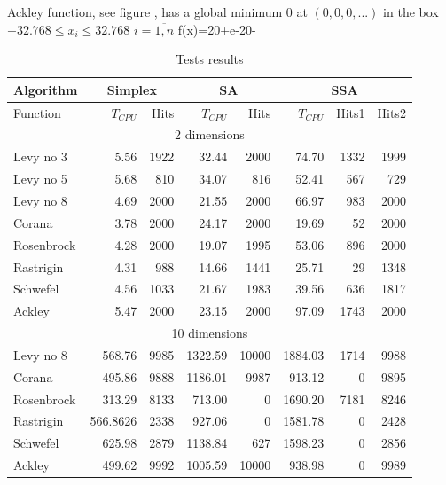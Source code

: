 \par{Ackley function, see figure ,  has a global minimum 0 at
$(0,0,0,...)$ in the box $-32.768\leq x_i \leq 32.768$ $i=\overline{1,n}$}
%
\be
\label{ackleyf}
f(x)=20+e-20\exp{\biggl[-0.2\sqrt{\frac{1}{n}\sum_{i=1}^{n}x_i^2}\biggr]}-\exp{\biggl[\frac{1}{n}\sum_{i=1}^{n}\cos(2\pi x_i)\biggr]}
\ee
%
%
\begin{table}[!htb]
\caption{Tests results}
\label{tabletest}
\begin{center}
\begin{tabular}[h]{|l|r|r|r|r|r|r|r|}
\hline
Algorithm & \multicolumn{2}{|c|}{Simplex} & \multicolumn{2}{|c|}{SA} &
\multicolumn{3}{|c|}{SSA}\\
\hline
Function& $T_{CPU}$ & Hits & $T_{CPU}$ & Hits& $T_{CPU}$ & Hits1 & Hits2\\
\hline
\hline
\multicolumn{8}{|c|}{2 dimensions}\\
\hline
Levy no 3&5.56&1922&32.44&2000&74.70&1332&1999\\
\hline
Levy no 5&5.68&810&34.07&816&52.41&567&729\\
\hline
Levy no 8&4.69&2000&21.55&2000&66.97&983&2000\\
\hline
Corana&3.78&2000&24.17&2000&19.69&52&2000\\
\hline
Rosenbrock&4.28&2000&19.07&1995&53.06&896&2000\\
\hline
Rastrigin&4.31&988&14.66&1441&25.71&29&1348\\
\hline
Schwefel&4.56&1033&21.67&1983&39.56&636&1817\\
\hline
Ackley&5.47&2000&23.15&2000&97.09&1743&2000\\
\hline
\hline
\multicolumn{8}{|c|}{10 dimensions}\\
\hline
Levy no 8&568.76&9985&1322.59&10000&1884.03&1714&9988\\
\hline
Corana&495.86&9888&1186.01&9987&913.12&0&9895\\
\hline
Rosenbrock&313.29&8133&713.00&0&1690.20&7181&8246\\
\hline
Rastrigin&566.8626&2338&927.06&0&1581.78&0&2428\\
\hline
Schwefel&625.98&2879&1138.84&627&1598.23&0&2856\\
\hline
Ackley&499.62&9992&1005.59&10000&938.98&0&9989\\
\hline
\hline
\end{tabular}
\end{center}
\end{table}
%
